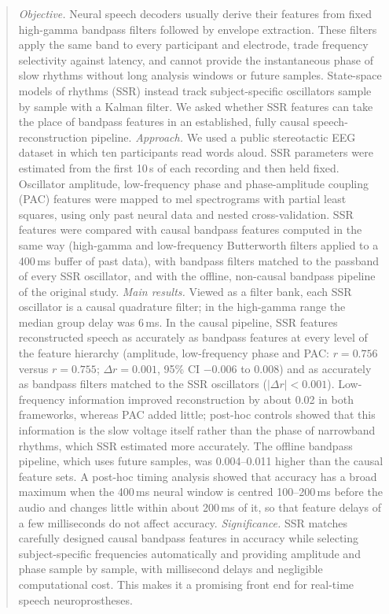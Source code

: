 \documentclass{iopjournal}
\begin{document}
\begin{abstract}
\textit{Objective.} Neural speech decoders usually derive their features from fixed high-gamma bandpass filters followed by envelope extraction. These filters apply the same band to every participant and electrode, trade frequency selectivity against latency, and cannot provide the instantaneous phase of slow rhythms without long analysis windows or future samples. State-space models of rhythms (SSR) instead track subject-specific oscillators sample by sample with a Kalman filter. We asked whether SSR features can take the place of bandpass features in an established, fully causal speech-reconstruction pipeline.
\textit{Approach.} We used a public stereotactic EEG dataset in which ten participants read words aloud. SSR parameters were estimated from the first 10\,s of each recording and then held fixed. Oscillator amplitude, low-frequency phase and phase-amplitude coupling (PAC) features were mapped to mel spectrograms with partial least squares, using only past neural data and nested cross-validation. SSR features were compared with causal bandpass features computed in the same way (high-gamma and low-frequency Butterworth filters applied to a 400\,ms buffer of past data), with bandpass filters matched to the passband of every SSR oscillator, and with the offline, non-causal bandpass pipeline of the original study.
\textit{Main results.} Viewed as a filter bank, each SSR oscillator is a causal quadrature filter; in the high-gamma range the median group delay was 6\,ms. In the causal pipeline, SSR features reconstructed speech as accurately as bandpass features at every level of the feature hierarchy (amplitude, low-frequency phase and PAC: $r=0.756$ versus $r=0.755$; $\Delta r=0.001$, 95\% CI $-0.006$ to $0.008$) and as accurately as bandpass filters matched to the SSR oscillators ($|\Delta r|<0.001$). Low-frequency information improved reconstruction by about 0.02 in both frameworks, whereas PAC added little; post-hoc controls showed that this information is the slow voltage itself rather than the phase of narrowband rhythms, which SSR estimated more accurately. The offline bandpass pipeline, which uses future samples, was 0.004--0.011 higher than the causal feature sets. A post-hoc timing analysis showed that accuracy has a broad maximum when the 400\,ms neural window is centred 100--200\,ms before the audio and changes little within about 200\,ms of it, so that feature delays of a few milliseconds do not affect accuracy.
\textit{Significance.} SSR matches carefully designed causal bandpass features in accuracy while selecting subject-specific frequencies automatically and providing amplitude and phase sample by sample, with millisecond delays and negligible computational cost. This makes it a promising front end for real-time speech neuroprostheses.
\end{abstract}
\end{document}
